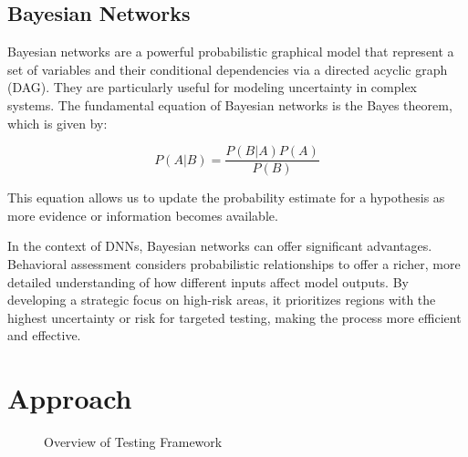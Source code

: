 \documentclass[10pt, conference, a4paper, final]{IEEEtran}
\begin{document}
\subsection{Bayesian Networks}


Bayesian networks are a powerful probabilistic graphical model that represent a set of variables and their conditional dependencies via a directed acyclic graph (DAG). They are particularly useful for modeling uncertainty in complex systems. The fundamental equation of Bayesian networks is the Bayes theorem, which is given by:

\begin{equation}
P(A|B) = \frac{P(B|A)P(A)}{P(B)}
\end{equation}

This equation allows us to update the probability estimate for a hypothesis as more evidence or information becomes available.

In the context of DNNs, Bayesian networks can offer significant advantages. Behavioral assessment considers probabilistic relationships to offer a richer, more detailed understanding of how different inputs affect model outputs. By developing a strategic focus on high-risk areas, it prioritizes regions with the highest uncertainty or risk for targeted testing, making the process more efficient and effective. 





\section{Approach}
\begin{figure}{}
    \centering

    \caption{Overview of Testing Framework}
    \label{fig:graph}
\end{figure}
\end{document}
